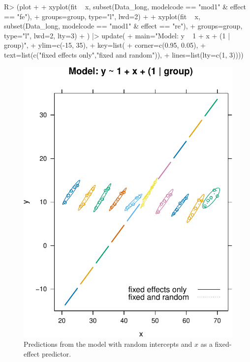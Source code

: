 \documentclass[
]{jss}
\begin{document}
\begin{CodeChunk}
\begin{CodeInput}
R> (plot +
+   xyplot(fit ~ x, subset(Data_long, modelcode == "mod1" & effect == "fe"),
+          groups=group, type="l", lwd=2) +
+   xyplot(fit ~ x, subset(Data_long, modelcode == "mod1" & effect == "re"),
+          groups=group, type="l", lwd=2, lty=3)
+ ) |> update(
+   main="Model: y ~ 1 + x + (1 | group)",
+   ylim=c(-15, 35),
+   key=list(
+     corner=c(0.95, 0.05),
+     text=list(c("fixed effects only","fixed and random")),
+     lines=list(lty=c(1, 3))))
\end{CodeInput}
\begin{figure}

{\centering \includegraphics[width=1\linewidth]{JSS-article_files/figure-latex/plot-fits-mod1-1} 

}

\caption[Predictions from the model with random intercepts and $x$ as a fixed-effect predictor]{Predictions from the model with random intercepts and $x$ as a fixed-effect predictor.}\label{fig:plot-fits-mod1}
\end{figure}
\end{CodeChunk}
\end{document}
